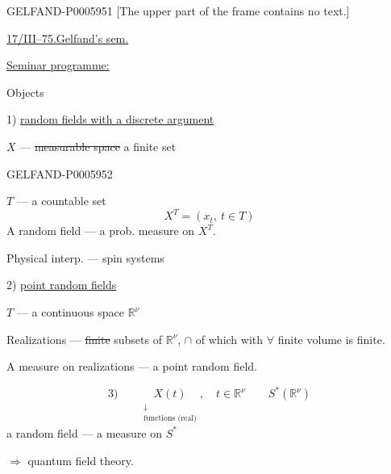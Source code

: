 \begin{GelfandAdjacentEvidence}{GELFAND-P000595}{1}
[The upper part of the frame contains no text.]

\underline{\underline{17/III--75.}}\qquad \underline{Gelfand's sem.}

\underline{Seminar programme:}


Objects

1) \underline{random fields with a discrete argument}

\(X\) — \sout{measurable space} a finite set
\end{GelfandAdjacentEvidence}
\begin{GelfandAdjacentEvidence}{GELFAND-P000595}{2}

\(T\) — a countable set
\[
X^T=(x_t,\ t\in T)
\]
A random field — a prob. measure on \(X^T\).

Physical interp. — spin systems

2) \underline{point random fields}

\(T\) — a continuous space \(\mathbb R^\nu\)

Realizations — \sout{finite} subsets of \(\mathbb R^\nu\),
\(\cap\) of which with \(\forall\) finite volume is finite.
\end{GelfandAdjacentEvidence}


A measure on realizations — a point random field.

\[
3)\qquad
\underset{\substack{\downarrow\\\text{functions (real)}}}{X(t)},\quad
t\in\mathbb R^\nu\qquad S^*(\mathbb R^\nu)
\]
a random field — a measure on \(S^*\)

\(\Rightarrow\) quantum field theory.


